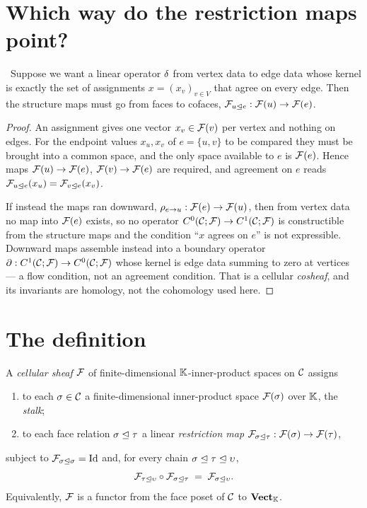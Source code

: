 \section{Which way do the restriction maps point?}\label{sec:direction}

\begin{proposition}\label{prop:direction}
\Proved\ Suppose we want a linear operator $\delta$ from vertex data to edge
data whose kernel is exactly the set of assignments $x=(x_v)_{v\in V}$ that
agree on every edge. Then the structure maps must go from faces to cofaces,
$\mathcal{F}_{u\trianglelefteq e}:\mathcal{F}(u)\to\mathcal{F}(e)$.
\end{proposition}
\begin{proof}
An assignment gives one vector $x_v\in\mathcal{F}(v)$ per vertex and nothing on
edges. For the endpoint values $x_u,x_v$ of $e=\{u,v\}$ to be compared they
must be brought into a common space, and the only space available to $e$ is
$\mathcal{F}(e)$. Hence maps $\mathcal{F}(u)\to\mathcal{F}(e)$, $\mathcal{F}(v)\to\mathcal{F}(e)$ are
required, and agreement on $e$ reads
$\mathcal{F}_{u\trianglelefteq e}(x_u)=\mathcal{F}_{v\trianglelefteq e}(x_v)$.

If instead the maps ran downward, $\rho_{e\to u}:\mathcal{F}(e)\to\mathcal{F}(u)$, then
from vertex data no map into $\mathcal{F}(e)$ exists, so no operator
$C^{0}(\mathcal{C};\mathcal{F})\to C^{1}(\mathcal{C};\mathcal{F})$ is constructible from the structure maps and the condition
``$x$ agrees on $e$'' is not expressible. Downward maps assemble instead into
a boundary operator $\partial:C^{1}(\mathcal{C};\mathcal{F})\to C^{0}(\mathcal{C};\mathcal{F})$ whose kernel is edge data
summing to zero at vertices --- a flow condition, not an agreement condition.
That is a cellular \emph{cosheaf}, and its invariants are homology, not the
cohomology used here.
\end{proof}

\section{The definition}

\begin{definition}\label{def:sheaf}
A \emph{cellular sheaf} $\mathcal{F}$ of finite-dimensional $\mathbb{K}$-inner-product
spaces on $\mathcal{C}$ assigns
\begin{enumerate}[label=(\roman*)]
  \item to each $\sigma\in\mathcal{C}$ a finite-dimensional inner-product space
        $\mathcal{F}(\sigma)$ over $\mathbb{K}$, the \emph{stalk};
  \item to each face relation $\sigma\trianglelefteq\tau$ a linear
        \emph{restriction map}
        $\mathcal{F}_{\sigma\trianglelefteq\tau}:\mathcal{F}(\sigma)\to\mathcal{F}(\tau)$,
\end{enumerate}
subject to $\mathcal{F}_{\sigma\trianglelefteq\sigma}=\mathrm{Id}$ and, for every chain
$\sigma\trianglelefteq\tau\trianglelefteq\upsilon$,
\begin{equation}\label{eq:functoriality}
  \mathcal{F}_{\tau\trianglelefteq\upsilon}\circ\mathcal{F}_{\sigma\trianglelefteq\tau}
  \;=\;\mathcal{F}_{\sigma\trianglelefteq\upsilon}.
\end{equation}
Equivalently, $\mathcal{F}$ is a functor from the face poset of $\mathcal{C}$ to
$\mathbf{Vect}_{\mathbb{K}}$.
\end{definition}

